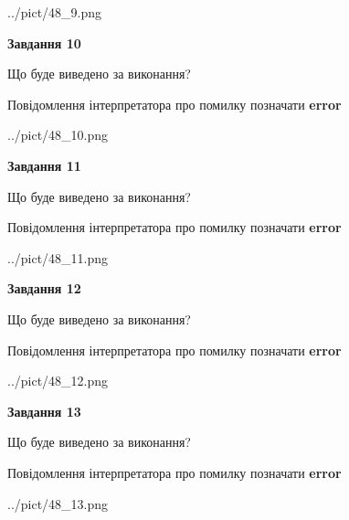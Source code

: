 \documentclass[11pt, ukrainian]{article}
\begin{document}
{\begin {large}
\begin{center}
	{../pict/48_9.png}
\end{center}
\newpage

{\begin {center}\textbf{Завдання 10}\end {center}}\par
Що буде виведено за виконання? \par
Повідомлення інтерпретатора про помилку позначати \textbf{error}

\begin{center}
	{../pict/48_10.png}
\end{center}
\newpage

{\begin {center}\textbf{Завдання 11}\end {center}}\par
Що буде виведено за виконання? \par
Повідомлення інтерпретатора про помилку позначати \textbf{error}

\begin{center}
	{../pict/48_11.png}
\end{center}
\newpage

{\begin {center}\textbf{Завдання 12}\end {center}}\par
Що буде виведено за виконання? \par
Повідомлення інтерпретатора про помилку позначати \textbf{error}

\begin{center}
	{../pict/48_12.png}
\end{center}
\newpage

{\begin {center}\textbf{Завдання 13}\end {center}}\par
Що буде виведено за виконання? \par
Повідомлення інтерпретатора про помилку позначати \textbf{error}

\begin{center}
	{../pict/48_13.png}
\end{center}
\newpage


\end{large}}
\end{document}
